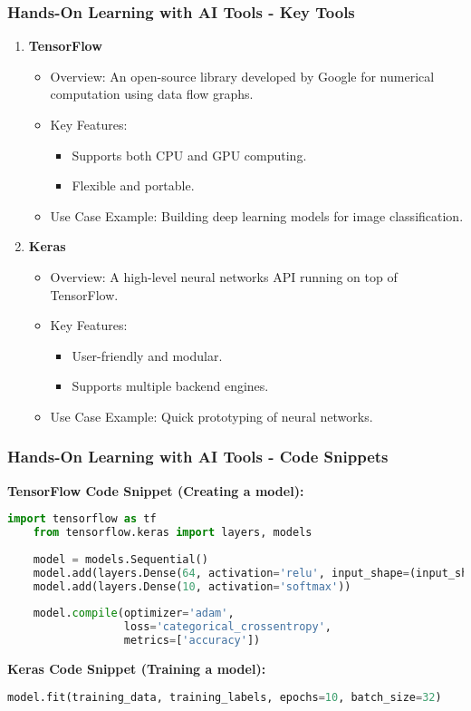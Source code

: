 \documentclass{beamer}
\begin{document}
\begin{frame}[fragile]
    \frametitle{Hands-On Learning with AI Tools - Key Tools}
    \begin{enumerate}
        \item \textbf{TensorFlow}
        \begin{itemize}
            \item Overview: An open-source library developed by Google for numerical computation using data flow graphs.
            \item Key Features:
            \begin{itemize}
                \item Supports both CPU and GPU computing.
                \item Flexible and portable.
            \end{itemize}
            \item Use Case Example: Building deep learning models for image classification.
        \end{itemize}

        \item \textbf{Keras}
        \begin{itemize}
            \item Overview: A high-level neural networks API running on top of TensorFlow.
            \item Key Features:
            \begin{itemize}
                \item User-friendly and modular.
                \item Supports multiple backend engines.
            \end{itemize}
            \item Use Case Example: Quick prototyping of neural networks.
        \end{itemize}
    \end{enumerate}
\end{frame}

\begin{frame}[fragile]
    \frametitle{Hands-On Learning with AI Tools - Code Snippets}
    \textbf{TensorFlow Code Snippet (Creating a model):}
    \begin{lstlisting}[language=Python]
    import tensorflow as tf
    from tensorflow.keras import layers, models
    
    model = models.Sequential()
    model.add(layers.Dense(64, activation='relu', input_shape=(input_shape,)))
    model.add(layers.Dense(10, activation='softmax'))
    
    model.compile(optimizer='adam',
                  loss='categorical_crossentropy',
                  metrics=['accuracy'])
    \end{lstlisting}
    
    \textbf{Keras Code Snippet (Training a model):}
    \begin{lstlisting}[language=Python]
    model.fit(training_data, training_labels, epochs=10, batch_size=32)
    \end{lstlisting}
\end{frame}
\end{document}
